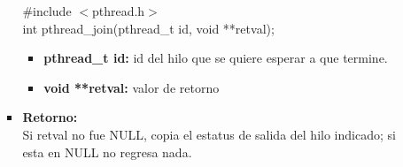 \documentclass[12pt]{article}
\begin{document}
\begin{enumerate}
\begin{itemize}
\begin{itemize}
                #include $<$pthread.h$>$\\
                int pthread\_join(pthread\_t id, void **retval);
                \begin{itemize}
                    \item \textbf{pthread\_t id:} id del hilo que se quiere esperar a que termine.
                    \item \textbf{void **retval:} valor de retorno
                \end{itemize}
                \item \textbf{Retorno:}\\
                Si retval no fue NULL, copia el estatus de salida del hilo indicado; si esta en NULL no regresa nada.
            \end{itemize}
            

\end{itemize}
\end{enumerate}
\end{document}
